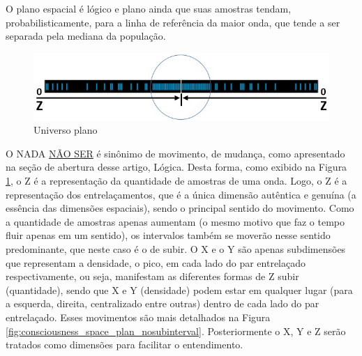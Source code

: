 O plano espacial é lógico e plano ainda que suas amostras tendam, probabilisticamente, para a linha de referência da maior onda, que tende a ser separada pela mediana da população.
	\begin{figure}[H]
	\caption{Universo plano}
	\label{fig:consciousness_flat_universe}
	\centering
	\includegraphics[scale=.6]{sections/images/consciousness_flat_universe.jpg}
	\end{figure}

O NADA \underline{NÃO SER} é sinônimo de movimento, de mudança, como apresentado na seção de abertura desse artigo, Lógica. Desta forma, como exibido na Figura \ref{fig:consciousness_flat_universe}, o Z é a representação da quantidade de amostras de uma onda. Logo, o Z é a representação dos entrelaçamentos, que é a única dimensão autêntica e genuína (a essência das dimensões espaciais), sendo o principal sentido do movimento. Como a quantidade de amostras apenas aumentam (o mesmo motivo que faz o tempo fluir apenas em um sentido), os intervalos também se moverão nesse sentido predominante, que neste caso é o de subir. O X e o Y são apenas subdimensões que representam a densidade, o pico, em cada lado do par entrelaçado respectivamente, ou seja, manifestam as diferentes formas de Z subir (quantidade), sendo que X e Y (densidade) podem estar em qualquer lugar (para a esquerda, direita, centralizado entre outras) dentro de cada lado do par entrelaçado. Esses movimentos são mais detalhados na Figura \ref{fig:consciousness_space_plan_nosubinterval}. Posteriormente o X, Y e Z serão tratados como dimensões para facilitar o entendimento.

